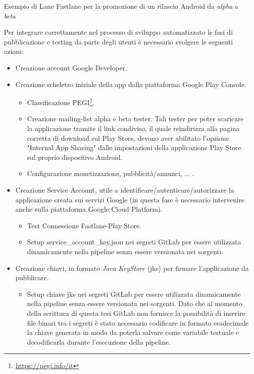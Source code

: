 \begin{listing}[H]
\inputminted{ruby}{code/4-gpc-promote}
\caption{Esempio di Lane Fastlane per la promozione di un rilascio Android da \textit{alpha} a \textit{beta}}
\end{listing}

Per integrare correttamente nel processo di sviluppo automatizzato le fasi di pubblicazione e testing da parte degli utenti è necessario svolgere le seguenti azioni:
\begin{itemize}
    \item Creazione account Google Developer.
    \item Creazione scheletro iniziale della app dalla piattaforma Google Play Console.
    \begin{itemize}
        \item Classificazione PEGI\footnote{\url{https://pegi.info/it}}.
        \item Creazione mailing-list alpha e beta tester. Tali tester per poter scaricare la applicazione tramite il link condiviso, il quale reindirizza alla pagina corretta di download sul Play Store, devono aver abilitato l'opzione "Internal App Sharing" dalle impostazioni della applicazione Play Store sul proprio dispositivo Android.
        \item Configurazione monetizzazione, pubblicità/annunci, ... .
    \end{itemize}
    \item Creazione Service Account, utile a identificare/autenticare/autorizzare la applicazione creata sui servizi Google (in questa fase è necessario intervenire anche sulla piattaforma Google Cloud Platform).
    \begin{itemize}
        \item Test Connessione Fastlane-Play Store.
        \item Setup service\_account\_key.json nei segreti GitLab per essere utilizzata dinamicamente nella pipeline senza essere versionata nei sorgenti.
    \end{itemize}
    \item Creazione chiavi, in formato \textit{Java KeyStore} (jks) per firmare l'applicazione da pubblicare.
    \begin{itemize}
        \item Setup chiave jks nei segreti GitLab per essere utilizzata dinamicamente nella pipeline senza essere versionata nei sorgenti. Dato che al momento della scrittura di questa tesi GitLab non fornisce la possibilità di inserire file binari tra i segreti è stato necessario codificare in formato esadecimale la chiave generata in modo da poterla salvare come variabile testuale e decodificarla durante l'esecuzione della pipeline\cite{gitlabciandroid}.

\end{itemize}
\end{itemize}
